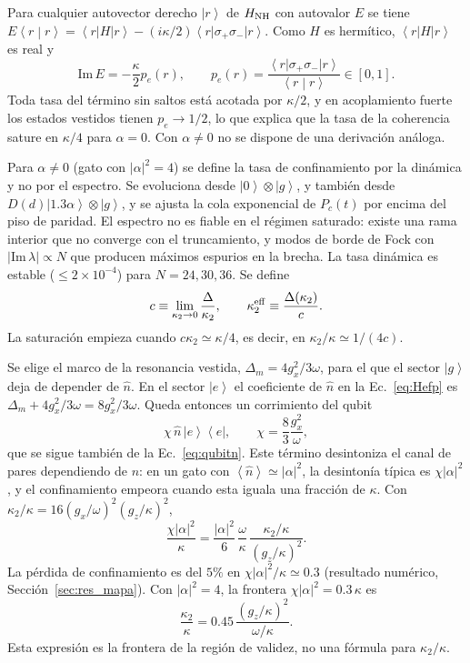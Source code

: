\documentclass[11pt,a4paper]{article}
\newcommand{\ket}[1]{\left|#1\right\rangle}
\newcommand{\bra}[1]{\left\langle#1\right|}
\newcommand{\braket}[2]{\left\langle#1\middle|#2\right\rangle}
\newcommand{\ave}[1]{\left\langle#1\right\rangle}
\newcommand{\spl}{\sigma_{+}}
\newcommand{\smi}{\sigma_{-}}
\newcommand{\Pe}{\ket{e}\!\bra{e}}
\newcommand{\hn}{\hat n}
\theoremstyle{definition}
\begin{document}
Para cualquier autovector derecho $\ket{r}$ de $H_{\rm NH}$ con autovalor $E$ se tiene $E\braket{r}{r}=\bra{r}H\ket{r}-(i\kappa/2)\bra{r}\spl\smi\ket{r}$. Como $H$ es hermítico, $\bra{r}H\ket{r}$ es real y
\begin{equation}
\mathrm{Im}\,E=-\frac\kappa2p_e(r),\qquad p_e(r)=\frac{\bra{r}\spl\smi\ket{r}}{\braket{r}{r}}\in[0,1].
\end{equation}
Toda tasa del término sin saltos está acotada por $\kappa/2$, y en acoplamiento fuerte los estados vestidos tienen $p_e\to1/2$, lo que explica que la tasa de la coherencia sature en $\kappa/4$ para $\alpha=0$. Con $\alpha\neq0$ no se dispone de una derivación análoga.


Para $\alpha\neq0$ (gato con $|\alpha|^2=4$) se define la tasa de confinamiento por la dinámica y no por el espectro. Se evoluciona desde $\ket{0}\otimes\ket{g}$, y también desde $D(d)\ket{1.3\alpha}\otimes\ket{g}$, y se ajusta la cola exponencial de $P_c(t)$ por encima del piso de paridad. El espectro no es fiable en el régimen saturado: existe una rama interior que no converge con el truncamiento, y modos de borde de Fock con $|\mathrm{Im}\,\lambda|\propto N$ que producen máximos espurios en la brecha. La tasa dinámica es estable ($\leq2\times10^{-4}$) para $N=24,30,36$. Se define
\begin{equation}
c\equiv\lim_{\kappa_2\to0}\frac{\Delta}{\kappa_2},\qquad \kappa_2^{\rm eff}\equiv\frac{\Delta(\kappa_2)}{c}.
\end{equation}
La saturación empieza cuando $c\kappa_2\simeq\kappa/4$, es decir, en $\kappa_2/\kappa\simeq1/(4c)$.

\label{sec:chi}

Se elige el marco de la resonancia vestida, $\Delta_m=4g_x^2/3\omega$, para el que el sector $\ket{g}$ deja de depender de $\hn$. En el sector $\ket{e}$ el coeficiente de $\hn$ en la Ec.~\eqref{eq:Hefp} es $\Delta_m+4g_x^2/3\omega=8g_x^2/3\omega$. Queda entonces un corrimiento del qubit
\begin{equation}
\chi\,\hn\,\Pe,\qquad \chi=\frac83\frac{g_x^2}{\omega},
\label{eq:chi}
\end{equation}
que se sigue también de la Ec.~\eqref{eq:qubitn}. Este término desintoniza el canal de pares dependiendo de $n$: en un gato con $\ave{\hn}\simeq|\alpha|^2$, la desintonía típica es $\chi|\alpha|^2$, y el confinamiento empeora cuando esta iguala una fracción de $\kappa$. Con $\kappa_2/\kappa=16(g_x/\omega)^2(g_z/\kappa)^2$,
\begin{equation}
\frac{\chi|\alpha|^2}{\kappa}=\frac{|\alpha|^2}{6}\,\frac{\omega}{\kappa}\,\frac{\kappa_2/\kappa}{(g_z/\kappa)^2}.
\label{eq:chik}
\end{equation}
La pérdida de confinamiento es del $5\%$ en $\chi|\alpha|^2/\kappa\simeq0.3$ (resultado numérico, Sección~\ref{sec:res_mapa}). Con $|\alpha|^2=4$, la frontera $\chi|\alpha|^2=0.3\,\kappa$ es
\begin{equation}
\frac{\kappa_2}{\kappa}=0.45\,\frac{(g_z/\kappa)^2}{\omega/\kappa}.
\label{eq:frontera}
\end{equation}
Esta expresión es la frontera de la región de validez, no una fórmula para $\kappa_2/\kappa$.
\end{document}
